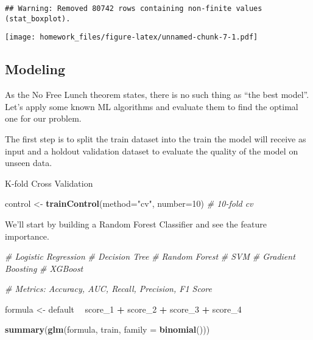 \documentclass[]{article}
\newenvironment{Shaded}{\begin{snugshade}}{\end{snugshade}}
\newcommand{\KeywordTok}[1]{\textcolor[rgb]{0.13,0.29,0.53}{\textbf{#1}}}
\newcommand{\DataTypeTok}[1]{\textcolor[rgb]{0.13,0.29,0.53}{#1}}
\newcommand{\DecValTok}[1]{\textcolor[rgb]{0.00,0.00,0.81}{#1}}
\newcommand{\StringTok}[1]{\textcolor[rgb]{0.31,0.60,0.02}{#1}}
\newcommand{\CommentTok}[1]{\textcolor[rgb]{0.56,0.35,0.01}{\textit{#1}}}
\newcommand{\OperatorTok}[1]{\textcolor[rgb]{0.81,0.36,0.00}{\textbf{#1}}}
\newcommand{\NormalTok}[1]{#1}
\begin{document}
\begin{verbatim}
## Warning: Removed 80742 rows containing non-finite values (stat_boxplot).
\end{verbatim}

\texttt{[image: homework\_files/figure-latex/unnamed-chunk-7-1.pdf]}

\hypertarget{modeling}{\subsection{Modeling}\label{modeling}}

As the No Free Lunch theorem states, there is no such thing as ``the
best model''. Let's apply some known ML algorithms and evaluate them to
find the optimal one for our problem.

The first step is to split the train dataset into the train the model
will receive as input and a holdout validation dataset to evaluate the
quality of the model on unseen data.

K-fold Cross Validation

\begin{Shaded}
\begin{Highlighting}[]
\NormalTok{control <-}\StringTok{ }\KeywordTok{trainControl}\NormalTok{(}\DataTypeTok{method=}\StringTok{"cv"}\NormalTok{, }\DataTypeTok{number=}\DecValTok{10}\NormalTok{) }\CommentTok{# 10-fold cv}
\end{Highlighting}
\end{Shaded}

We'll start by building a Random Forest Classifier and see the feature
importance.

\begin{Shaded}
\begin{Highlighting}[]
\CommentTok{# Logistic Regression}
\CommentTok{# Decision Tree}
\CommentTok{# Random Forest}
\CommentTok{# SVM}
\CommentTok{# Gradient Boosting}
\CommentTok{# XGBoost}

\CommentTok{# Metrics: Accuracy, AUC, Recall, Precision, F1 Score}
\end{Highlighting}
\end{Shaded}

\begin{Shaded}
\begin{Highlighting}[]
\NormalTok{formula <-}\StringTok{ }\NormalTok{default }\OperatorTok{~}\StringTok{ }\NormalTok{score_}\DecValTok{1} \OperatorTok{+}
\StringTok{  }\NormalTok{score_}\DecValTok{2} \OperatorTok{+}\StringTok{ }\NormalTok{score_}\DecValTok{3} \OperatorTok{+}\StringTok{ }\NormalTok{score_}\DecValTok{4}

\KeywordTok{summary}\NormalTok{(}\KeywordTok{glm}\NormalTok{(formula, train, }\DataTypeTok{family =} \KeywordTok{binomial}\NormalTok{()))}
\end{Highlighting}
\end{Shaded}
\end{document}
